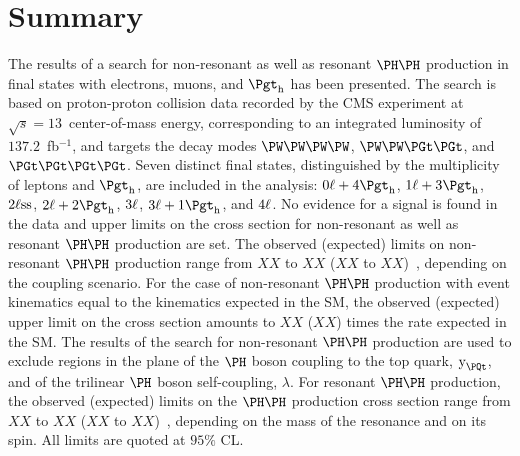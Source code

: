 \section{Summary}
\label{sec:summary}

The results of a search for non-resonant as well as resonant $\HH$ production in final states with electrons, muons, and $\tauh$ has been presented.
The search is based on proton-proton collision data recorded by the CMS experiment at $\sqrt{s} = 13$~\TeV center-of-mass energy,
corresponding to an integrated luminosity of $137.2$~fb$^{-1}$,
and targets the decay modes $\PW\PW\PW\PW$, $\PW\PW\PGt\PGt$, and $\PGt\PGt\PGt\PGt$.
Seven distinct final states, distinguished by the multiplicity of leptons and $\tauh$, are included in the analysis:
$0\Plepton + 4\tauh$, $1\Plepton + 3\tauh$, $2\ell\text{ss}$, $2\Plepton + 2\tauh$, $3\ell$, $3\Plepton + 1\tauh$, and $4\ell$.
No evidence for a signal is found in the data and upper limits on the cross section for non-resonant as well as resonant $\HH$ production are set.
The observed (expected) limits on non-resonant $\HH$ production range from $XX$ to $XX$ ($XX$ to $XX$)~\pb, depending on the coupling scenario.
For the case of non-resonant $\HH$ production with event kinematics equal to the kinematics expected in the SM,
the observed (expected) upper limit on the cross section amounts to $XX$ ($XX$) times the rate expected in the SM.
The results of the search for non-resonant $\HH$ production are used to exclude regions in the plane of the $\PHiggs$ boson coupling to the top quark, $\yt$,
and of the trilinear $\PHiggs$ boson self-coupling, $\lambda$.
For resonant $\HH$ production, the observed (expected) limits on the $\HH$ production cross section range from $XX$ to $XX$ ($XX$ to $XX$)~\pb, 
depending on the mass of the resonance and on its spin.
All limits are quoted at $95\%$ CL.
